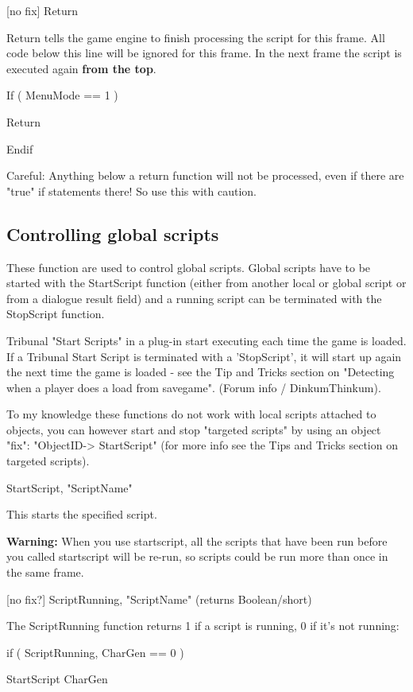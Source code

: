 {[}no fix{]} Return

Return tells the game engine to finish processing the script for this
frame. All code below this line will be ignored for this frame. In the
next frame the script is executed again \textbf{from the top}.

If ( MenuMode == 1 )

Return

Endif

Careful: Anything below a return function will not be processed, even if
there are "true" if statements there! So use this with caution.

\hypertarget{controlling-global-scripts}{%
\subsection{Controlling global
scripts}\label{controlling-global-scripts}}

These function are used to control global scripts. Global scripts have
to be started with the StartScript function (either from another local
or global script or from a dialogue result field) and a running script
can be terminated with the StopScript function.

Tribunal "Start Scripts" in a plug-in start executing each time the game
is loaded. If a Tribunal Start Script is terminated with a 'StopScript',
it will start up again the next time the game is loaded - see the Tip
and Tricks section on "Detecting when a player does a load from
savegame". (Forum info / DinkumThinkum).

To my knowledge these functions do not work with local scripts attached
to objects, you can however start and stop "targeted scripts" by using
an object "fix": "ObjectID-> StartScript" (for more info see
the Tips and Tricks section on targeted scripts).

StartScript, "ScriptName"

This starts the specified script.

\textbf{Warning:} When you use startscript, all the scripts that have
been run before you called startscript will be re-run, so scripts could
be run more than once in the same frame.

{[}no fix?{]} ScriptRunning, "ScriptName" (returns Boolean/short)

The ScriptRunning function returns 1 if a script is running, 0 if it's
not running:

if ( ScriptRunning, CharGen == 0 )

StartScript CharGen

